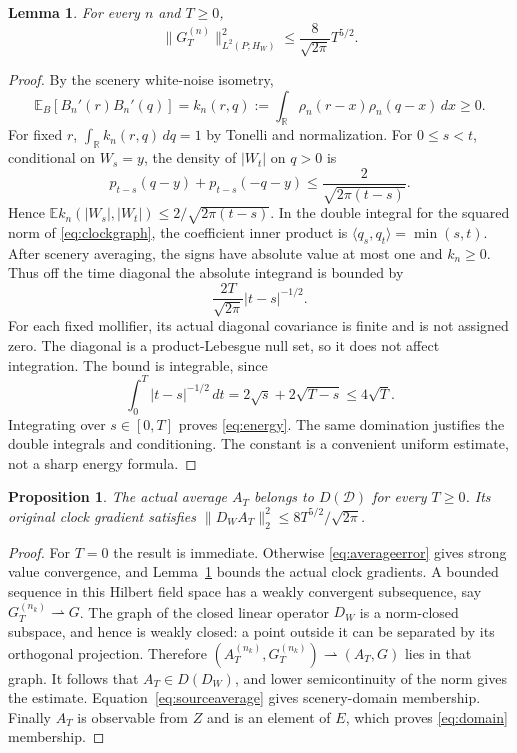 \documentclass[11pt]{article}
\newtheorem{lemma}[theorem]{Lemma}
\newtheorem{proposition}[theorem]{Proposition}
\newcommand{\R}{\mathbb R}\newcommand{\E}{\mathbb E}
\newcommand{\D}{\mathcal D}\newcommand{\G}{\mathcal G}
\begin{document}
\begin{lemma}\label{lem:folded}
For every $n$ and $T\geq0$,
\begin{equation}\label{eq:energy}
 \|G_T^{(n)}\|_{L^2(P;H_W)}^2
 \leq\frac8{\sqrt{2\pi}}T^{5/2}.
\end{equation}
\end{lemma}
\begin{proof}
By the scenery white-noise isometry,
\[
 \E_B[B_n'(r)B_n'(q)]
 =k_n(r,q):=\int_{\R}\rho_n(r-x)\rho_n(q-x)\,dx\geq0.
\]
For fixed $r$, $\int_{\R}k_n(r,q)\,dq=1$ by Tonelli and normalization.
For $0\leq s<t$, conditional on $W_s=y$, the density of $|W_t|$ on
$q>0$ is
\[
 p_{t-s}(q-y)+p_{t-s}(-q-y)
 \leq\frac2{\sqrt{2\pi(t-s)}}.
\]
Hence $\E k_n(|W_s|,|W_t|)\leq2/\sqrt{2\pi(t-s)}$.
In the double integral for the squared norm of \eqref{eq:clockgraph},
the coefficient inner product is $\langle q_s,q_t\rangle=\min(s,t)$.
After scenery averaging, the signs have absolute value at most one and
$k_n\geq0$. Thus off the time diagonal the absolute integrand is bounded
by
\[
 \frac{2T}{\sqrt{2\pi}}|t-s|^{-1/2}.
\]
For each fixed mollifier, its actual diagonal covariance is finite and
is not assigned zero. The diagonal is a product-Lebesgue null set, so it
does not affect integration. The bound is integrable, since
\[
 \int_0^T|t-s|^{-1/2}\,dt
 =2\sqrt{s}+2\sqrt{T-s}\leq4\sqrt T.
\]
Integrating over $s\in[0,T]$ proves \eqref{eq:energy}. The same domination
justifies the double integrals and conditioning. The constant is a
convenient uniform estimate, not a sharp energy formula.
\end{proof}

\begin{proposition}\label{prop:average}
The actual average $A_T$ belongs to $D(\D)$ for every $T\geq0$. Its
original clock gradient satisfies
$\|D_WA_T\|_2^2\leq8T^{5/2}/\sqrt{2\pi}$.
\end{proposition}
\begin{proof}
For $T=0$ the result is immediate. Otherwise \eqref{eq:averageerror}
gives strong value convergence, and Lemma~\ref{lem:folded} bounds the
actual clock gradients. A bounded sequence in this Hilbert field space
has a weakly convergent subsequence, say $G_T^{(n_k)}\rightharpoonup G$.
The graph of the closed linear operator $D_W$ is a norm-closed subspace,
and hence is weakly closed: a point outside it can be separated by its
orthogonal projection. Therefore
$(A_T^{(n_k)},G_T^{(n_k)})\rightharpoonup(A_T,G)$ lies in that graph.
It follows that $A_T\in D(D_W)$, and lower semicontinuity of the norm
gives the estimate. Equation~\eqref{eq:sourceaverage} gives scenery-domain
membership. Finally $A_T$ is observable from $Z$ and is an element of $E$,
which proves \eqref{eq:domain} membership.
\end{proof}
\end{document}

